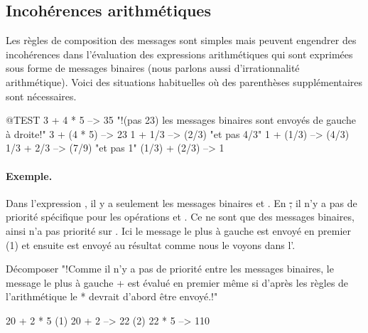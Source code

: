 \documentclass[a4paper,10pt,twoside]{book}
\begin{document}
\subsection{Incoh\'erences arithm\'etiques}
Les r\`egles de composition des messages sont simples mais peuvent
engendrer des incoh\'erences dans l'\'evaluation des expressions
arithm\'etiques qui sont exprim\'ees sous forme de messages binaires
(nous parlons aussi d'irrationnalit\'e arithm\'etique).
Voici des situations habituelles o\`u des parenth\`eses suppl\'ementaires sont n\'ecessaires.

\begin{code}{@TEST}
3 + 4 * 5      --> 35    "!(pas 23)  les messages binaires sont envoy\'es de gauche \`a droite!"
3 + (4 * 5)    --> 23
1 + 1/3         --> (2/3)    "et pas 4/3"
1 + (1/3)       --> (4/3)
1/3 + 2/3       --> (7/9)    "et pas 1"
(1/3) + (2/3)  --> 1
\end{code}

\paragraph{Exemple.} 
Dans l'expression , il y a seulement les messages
binaires \ct{+} et \ct{*}. En \st, il n'y a pas de priorit\'e
sp\'ecifique pour les op\'erations \ct{+} et \ct{*}. Ce ne sont que
des messages binaires, ainsi \ct{*} n'a pas priorit\'e sur \ct{+}. Ici
le message le plus \`a gauche \ct{+} est envoy\'e en premier (1) et
ensuite \ct{*} est envoy\'e au r\'esultat comme nous le voyons dans l'.  

\begin{example}[binaryMessages1]{D\'ecomposer }{}
"!Comme il n'y a pas de priorit\'e entre les messages binaires, le message le plus \`a gauche + est \'evalu\'e en premier m\^eme si d'apr\`es les r\`egles de l'arithm\'etique le * devrait d'abord \^etre envoy\'e.!"

      20 + 2 * 5 
(1)  20 + 2 --> 22
(2)  22       * 5 --> 110
\end{example}
\end{document}
